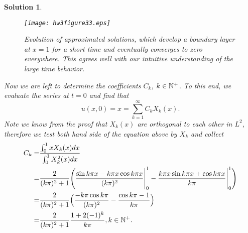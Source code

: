 \documentclass[6pt]{article}
\newtheorem{solution}{Solution}
\numberwithin{equation}{section}
\def\mathbb{\Bbb}
\begin{document}
\begin{enumerate}
\begin{solution}
\begin{figure}[h!]%
  \centering
\texttt{[image: hw3figure33.eps]}
\caption{Evolution of approximated solutions, which develop a boundary layer at $x=1$ for a short time and eventually converges to zero everywhere.  This agrees well with our intuitive understanding of the large time behavior.}
\end{figure}

Now we are left to determine the coefficients $C_k$, $k\in\mathbb N^+$.  To this end, we evaluate the series at $t=0$ and find that
\[u(x,0)=x=\sum_{k=1}^\infty C_k X_k(x).\]
Note we know from the proof that $X_k(x)$ are orthogonal to each other in $L^2$, therefore we test both hand side of the equation above by $X_k$ and collect
\begin{align*}
C_k=&\frac{\int_0^1 xX_k(x)dx}{\int_0^1 X^2_k(x)dx}\\
   =&\frac{2}{(k\pi)^2+1}\Bigg(\frac{\sin k\pi x-k\pi x\cos k\pi x}{(k\pi)^2}\Bigg|_0^1-\frac{k\pi x\sin k\pi x+\cos k\pi x}{k\pi}\Bigg|_0^1\Bigg) \\
   =&\frac{2}{(k\pi)^2+1}\Big(\frac{-k\pi \cos k\pi}{(k\pi)^2}-\frac{\cos k\pi-1}{k\pi}\Big)\\
   =& \frac{2}{(k\pi)^2+1}\frac{1+2(-1)^k}{k\pi}  , k\in\mathbb N^+.
\end{align*}

\end{solution}




\end{enumerate}
\end{document}
